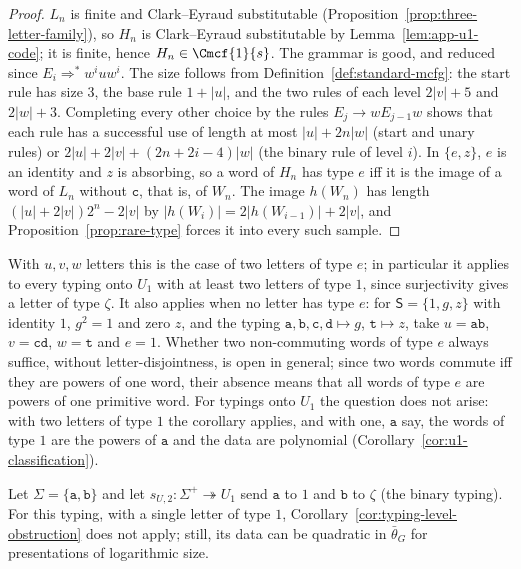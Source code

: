\begin{proof}
$L_n$ is finite and Clark--Eyraud substitutable
(Proposition~\ref{prop:three-letter-family}), so $H_n$ is Clark--Eyraud
substitutable by Lemma~\ref{lem:app-u1-code}; it is finite, hence
$H_n\in\Cmcf{1}{s}$.  The grammar is good, and reduced since
$E_i\Rightarrow^*w^iuw^i$.  The size follows from
Definition~\ref{def:standard-mcfg}: the start rule has size $3$, the base rule
$1+|u|$, and the two rules of each level $2|v|+5$ and $2|w|+3$.  Completing every
other choice by the rules $E_j\to wE_{j-1}w$ shows that each rule has a
successful use of length at most $|u|+2n|w|$ (start and unary rules) or
$2|u|+2|v|+(2n+2i-4)|w|$ (the binary rule of level $i$).  In $\{e,z\}$, $e$ is an
identity and $z$ is absorbing, so a word of $H_n$ has type $e$ iff it is the
image of a word of $L_n$ without $\mathtt c$, that is, of $W_n$.  The image $h(W_n)$ has length
$(|u|+2|v|)2^n-2|v|$ by $|h(W_i)|=2|h(W_{i-1})|+2|v|$, and
Proposition~\ref{prop:rare-type} forces it into every such sample.
\end{proof}

With $u,v,w$ letters this is the case of two letters of type $e$; in
particular it applies to every typing onto $U_1$ with at least two letters of
type $1$, since surjectivity gives a letter of type $\zeta$.  It also applies
when no letter has type $e$: for $\mathsf S=\{1,g,z\}$ with identity $1$,
$g^2=1$ and zero $z$, and the typing $\mathtt a,\mathtt b,\mathtt c,\mathtt d\mapsto g$,
$\mathtt t\mapsto z$, take $u=\mathtt{ab}$, $v=\mathtt{cd}$, $w=\mathtt t$ and
$e=1$.  Whether two non-commuting words of type $e$ always suffice, without
letter-disjointness, is open in general; since two words commute iff they are
powers of one word, their absence means that all words of type $e$ are powers of
one primitive word.  For typings onto $U_1$ the question does not arise: with
two letters of type $1$ the corollary applies, and with one, $\mathtt a$ say, the
words of type $1$ are the powers of $\mathtt a$ and the data are polynomial
(Corollary~\ref{cor:u1-classification}).

Let $\Sigma=\{\mathtt a,\mathtt b\}$ and let $s_{U,2}:\Sigma^+\twoheadrightarrow U_1$ send $\mathtt a$ to
$1$ and $\mathtt b$ to $\zeta$ (the binary typing).  For this typing, with a single letter of type $1$,
Corollary~\ref{cor:typing-level-obstruction} does not apply; still, its data can
be quadratic in $\bar\theta_G$ for presentations of logarithmic size.

